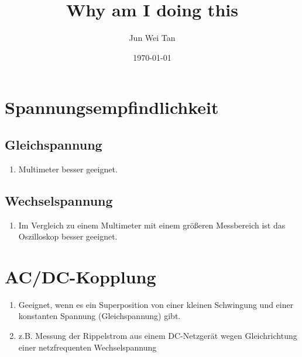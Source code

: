 \documentclass[prb,12pt]{revtex4-2}
\theoremstyle{definition}
\theoremstyle{definition}
\begin{document}
\title{Why am I doing this}
	\author{Jun Wei Tan}
	\date{\today}
	\maketitle

\section{Spannungsempfindlichkeit}
\subsection{Gleichspannung}
\begin{enumerate}
	\item Multimeter besser geeignet.
\end{enumerate}
\subsection{Wechselspannung}
\begin{enumerate}
	\item Im Vergleich zu einem Multimeter mit einem größeren Messbereich ist das Oszilloskop besser geeignet.
\end{enumerate}
\section{AC/DC-Kopplung}
\begin{enumerate}
	\item Geeignet, wenn es ein Superposition von einer kleinen Schwingung und einer konstanten Spannung (Gleichspannung) gibt.\cite{Keysight}
	\item z.B. Messung der Rippelstrom aus einem DC-Netzgerät wegen Gleichrichtung einer netzfrequenten Wechselspannung~	\cite{zhu1996switched,scoles1980handbook}
\end{enumerate}


	
\end{document}
